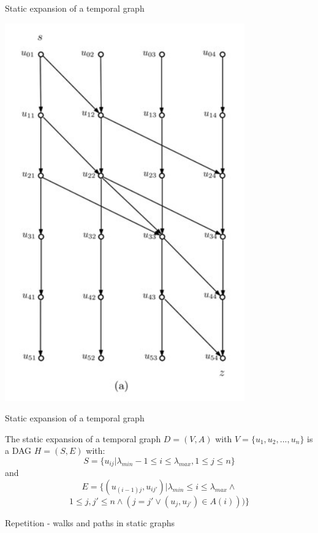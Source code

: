 \documentclass{beamer}
\begin{document}
\begin{frame}{Static expansion of a temporal graph}
	\begin{center}
		\includegraphics[height=0.8\textheight]{media/static_expansion_of_graphs.png}
	\end{center}
	\cite[page 318]{Michail2015}
\end{frame}

\begin{frame}{Static expansion of a temporal graph}
	\begin{tcolorbox}[title=Definition: static expansion of a graph]
		The static expansion of a temporal graph $D = (V, A)$ with $V = \{ u_1, u_2, ..., u_n \}$ is a DAG $H = (S, E)$ with:
		$$ S = \{ u_{ij} | \lambda_{min} - 1 \leq i \leq \lambda_{max}, 1 \leq j \leq n \} $$
		and
		$$ E = \{ (u_{(i - 1)j}, u_{ij'}) | \lambda_{min} \leq i \leq \lambda_{max} \land $$
		$$ 1 \leq j, j' \leq n \land (j = j' \lor (u_j, u_{j'}) \in A(i))) \} $$
	\end{tcolorbox}
\end{frame}


\begin{frame}{Repetition - walks and paths in static graphs}
  \begin{itemize}
  \end{itemize}
\end{frame}
\end{document}
